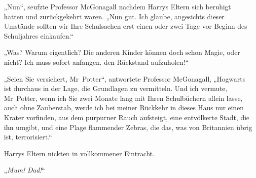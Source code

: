 „Nun“, seufzte Professor McGonagall nachdem Harrys Eltern sich beruhigt hatten und zurückgekehrt waren. „Nun gut. Ich glaube, angesichts dieser Umstände sollten wir Ihre Schulsachen erst einen oder zwei Tage vor Beginn des Schuljahres einkaufen.“

„Was? Warum eigentlich? Die anderen Kinder können doch schon Magie, oder nicht? Ich muss sofort anfangen, den Rückstand aufzuholen!“

„Seien Sie versichert, Mr~Potter“, antwortete Professor McGonagall, „Hogwarts ist durchaus in der Lage, die Grundlagen zu vermitteln. Und ich vermute, Mr~Potter, wenn ich Sie zwei Monate lang mit Ihren Schulbüchern allein lasse, auch ohne Zauberstab, werde ich bei meiner Rückkehr in dieses Haus nur einen Krater vorfinden, aus dem purpurner Rauch aufsteigt, eine entvölkerte Stadt, die ihn umgibt, und eine Plage flammender Zebras, die das, was von Britannien übrig ist, terrorisiert.“

Harrys Eltern nickten in vollkommener Eintracht.

„\emph{Mum! Dad!}“

